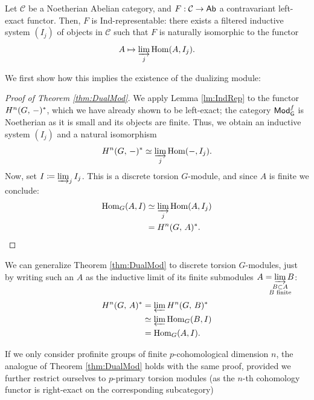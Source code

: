 \documentclass[a4paper, oneside]{memoir}
\begin{document}
\begin{lemma}\label{lm:IndRep}
	Let \(\mathcal{C}\) be a Noetherian Abelian category, and \(F: \mathcal{C}\to\mathsf{Ab}\) a contravariant left-exact functor.
	Then, \(F\) is \textup{Ind}-representable: there exists a filtered inductive system \((I_j)\) of objects in \(\mathcal{C}\) such that \(F\) is naturally isomorphic to the functor
	\[A\mapsto \varinjlim_j \operatorname{Hom}(A, I_j).\]
\end{lemma}

We first show how this implies the existence of the dualizing module:
\begin{proof}[Proof of Theorem \ref{thm:DualMod}]
	We apply Lemma \ref{lm:IndRep} to the functor \(H^{n}( G, \, - )^*\), which we have already shown to be left-exact; the category \(\mathsf{Mod}_{\mathsf{G}}^f\) is Noetherian as it is small and its objects are finite.
	Thus, we obtain an inductive system \((I_j)\) and a natural isomorphism
	\[
		H^{n}( G, \, - )^* \simeq \varinjlim_j \operatorname{Hom}(-,I_j).
	\]
	Now, set \(I\coloneqq \varinjlim_j I_j\). This is a discrete torsion \(G\)-module, and since \(A\) is finite we conclude:
	\begin{align*}
		\operatorname{Hom}_G(A,I) & \simeq \varinjlim_j \operatorname{Hom}(A,I_j) \\
		            & = H^{n}( G, \, A )^*.
	\end{align*}
\end{proof}

\begin{remark}\label{rm:Torsion}
	We can generalize Theorem \ref{thm:DualMod} to discrete torsion \(G\)-modules, just by writing such an \(A\) as the inductive limit of its finite submodules \(A=\displaystyle\varinjlim_{\mathclap{\substack{B\subset A \\B\text{ finite}}}}{B}\):
	\begin{align*}
		H^{n}( G, \, A )^* & =\varprojlim H^{n}( G, \, B )^*     \\
		              & \simeq \varprojlim \operatorname{Hom}_G(B,I) \\
		              & = \operatorname{Hom}_G(A,I).
	\end{align*}
\end{remark}
\begin{remark}\label{rm:pTorsion}
	If we only consider profinite groups of finite \(p\)-cohomological dimension \(n\), the analogue of Theorem \ref{thm:DualMod} holds with the same proof, provided we further restrict ourselves to \(p\)-primary torsion modules (as the \(n\)-th cohomology functor is right-exact on the corresponding subcategory)
\end{remark}
\end{document}
